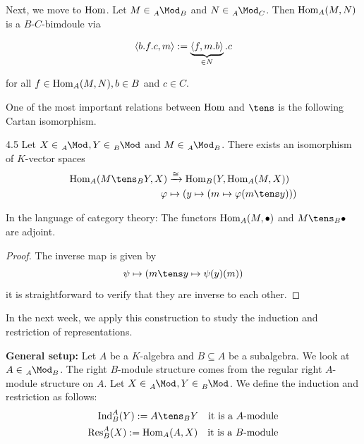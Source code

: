 \documentclass[twoside = false,	%
		headsepline,		%
		parskip = true,
		]{scrbook}						%
\begin{document}
    Next, we move to $\mathrm{Hom}$. Let $M \in \tensor[_A]{\Mod}{_B}$ and $N \in \tensor[_A]{\Mod}{_C}$. Then $\mathrm{Hom}_A(M,N)$ is a $B$-$C$-bimdoule via

    \begin{equation*}
        \left\langle b.f.c,m\right\rangle := \underbrace{\left\langle f,m.b\right\rangle}_{\in N}.c 
    \end{equation*}

    for all $f \in \mathrm{Hom}_A(M,N), b \in B$ and $c \in C$.

    One of the most important relations between $\mathrm{Hom}$ and $\tens$ is the following Cartan isomorphism.

    \begin{proposition}{}{4.5}
        Let $X \in \tensor[_A]{\Mod}{^{}}, Y \in \tensor[_B]{\Mod}{^{}}$ and $M \in \tensor[_A]{\Mod}{_B}$. There exists an isomorphism of $K$-vector spaces
        \begin{equation*}
        \begin{split}
            \Hom_A(M \tens_B Y, X) &\xrightarrow{\cong} \Hom_B(Y,\Hom_A(M,X)) \\
            \varphi &\mapsto (y \mapsto (m \mapsto \varphi(m \tens y)))
        \end{split}
        \end{equation*}
    \end{proposition}
    In the language of category theory: The functors $\mathrm{Hom}_A(M,\bullet)$ and $M \tens_B \bullet$ are adjoint.

    \begin{proof}
        The inverse map is given by
        \begin{equation*}
            \psi \mapsto (m \tens y \mapsto \psi(y)(m))
        \end{equation*}
        it is straightforward to verify that they are inverse to each other.
    \end{proof}
    In the next week, we apply this construction to study the induction and restriction of representations.
    
    \textbf{General setup:}
        Let $A$ be a $K$-algebra and $B \subseteq A$ be a subalgebra. We look at $A \in \tensor[_A]{\Mod}{_B}$. The right $B$-module structure comes from the regular right $A$-module structure on $A$. Let $X \in \tensor[_A]{\Mod}{^{}}, Y \in \tensor[_B]{\Mod}{^{}}$. We define the induction and restriction as follows:
        \begin{equation*}
        \begin{split}
            \Ind_B^A(Y) := A \tens_B Y \quad \text{it is a $A$-module} \\
            \Res_B^A(X) := \Hom_A(A,X) \quad \text{it is a $B$-module}
        \end{split}
        \end{equation*}
    
\end{document}
